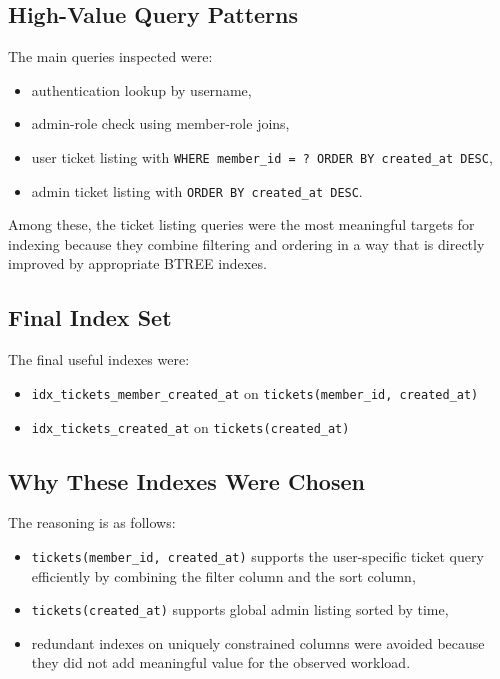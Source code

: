 \documentclass[12pt,a4paper]{article}
\begin{document}
\subsection{High-Value Query Patterns}
The main queries inspected were:
\begin{itemize}[leftmargin=1.5em]
    \item authentication lookup by username,
    \item admin-role check using member-role joins,
    \item user ticket listing with \texttt{WHERE member\_id = ? ORDER BY created\_at DESC},
    \item admin ticket listing with \texttt{ORDER BY created\_at DESC}.
\end{itemize}

Among these, the ticket listing queries were the most meaningful targets for indexing because they combine filtering and ordering in a way that is directly improved by appropriate BTREE indexes.

\subsection{Final Index Set}
The final useful indexes were:
\begin{itemize}[leftmargin=1.5em]
    \item \texttt{idx\_tickets\_member\_created\_at} on \texttt{tickets(member\_id, created\_at)}
    \item \texttt{idx\_tickets\_created\_at} on \texttt{tickets(created\_at)}
\end{itemize}

\subsection{Why These Indexes Were Chosen}
The reasoning is as follows:
\begin{itemize}[leftmargin=1.5em]
    \item \texttt{tickets(member\_id, created\_at)} supports the user-specific ticket query efficiently by combining the filter column and the sort column,
    \item \texttt{tickets(created\_at)} supports global admin listing sorted by time,
    \item redundant indexes on uniquely constrained columns were avoided because they did not add meaningful value for the observed workload.
\end{itemize}
\end{document}
